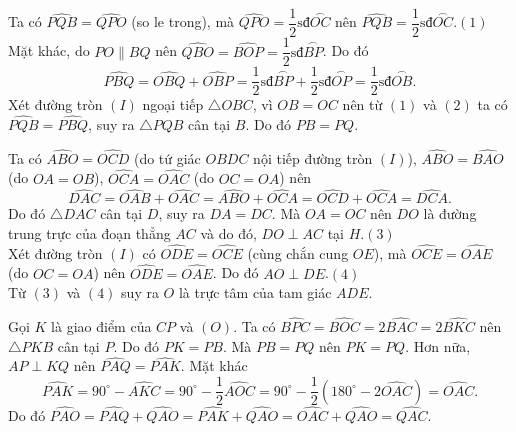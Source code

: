 \begin{ex}
{    \begin{listEX}
        \item Ta có $\widehat{PQB}=\widehat{QPO}$ (so le trong), mà $\widehat{QPO}=\dfrac{1}{2}\text{sđ}\overset{\displaystyle\frown}{OC}$ nên $\widehat{PQB}=\dfrac{1}{2}\text{sđ}\overset{\displaystyle\frown}{OC}$.\hfill$(1)$\\
Mặt khác, do $PO\parallel BQ$ nên $\widehat{QBO}=\widehat{BOP}=\dfrac{1}{2}\text{sđ}\overset{\displaystyle\frown}{BP}$. Do đó \[\widehat{PBQ}=\widehat{OBQ}+\widehat{OBP}=\dfrac{1}{2}\text{sđ}\overset{\displaystyle\frown}{BP}+\dfrac{1}{2}\text{sđ}\overset{\displaystyle\frown}{OP}=\dfrac{1}{2}\text{sđ}\overset{\displaystyle\frown}{OB}.\tag{2}\]
Xét đường tròn $(I)$ ngoại tiếp $\triangle OBC$, vì $OB=OC$ nên từ $(1)$ và $(2)$ ta có $\widehat{PQB}=\widehat{PBQ}$, suy ra $\triangle PQB$ cân tại $B$. Do đó $PB=PQ$.
        \item Ta có $\widehat{ABO}=\widehat{OCD}$ (do tứ giác $OBDC$ nội tiếp đường tròn $(I)$), $\widehat{ABO}=\widehat{BAO}$ (do $OA=OB$), $\widehat{OCA}=\widehat{OAC}$ (do $OC=OA$) nên $$\widehat{DAC}=\widehat{OAB}+\widehat{OAC}=\widehat{ABO}+\widehat{OCA}=\widehat{OCD}+\widehat{OCA}=\widehat{DCA}.$$
	Do đó $\triangle DAC$ cân tại $D$, suy ra $DA=DC$. Mà $OA=OC$ nên $DO$ là đường trung trực của đoạn thẳng $AC$ và do đó, $DO\perp AC$ tại $H$.\hfill$(3)$\\
Xét đường tròn $(I)$ có $\widehat{ODE}=\widehat{OCE}$ (cùng chắn cung $OE$), mà $\widehat{OCE}=\widehat{OAE}$ (do $OC=OA$) nên $\widehat{ODE}=\widehat{OAE}$. Do đó $AO\perp DE$.\hfill$(4)$\\
Từ $(3)$ và $(4)$ suy ra $O$ là trực tâm của tam giác $ADE$.
        \item Gọi $K$ là giao điểm của $CP$ và $(O)$. Ta có $\widehat{BPC}=\widehat{BOC}=2\widehat{BAC}=2\widehat{BKC}$ nên $\triangle PKB$ cân tại $P$. Do đó $PK=PB$. Mà $PB=PQ$ nên $PK=PQ$. Hơn nữa, $AP\perp KQ$ nên $\widehat{PAQ}=\widehat{PAK}$. Mặt khác
$$\widehat{PAK}=90^\circ-\widehat{AKC}=90^\circ-\dfrac{1}{2}\widehat{AOC}=90^\circ-\dfrac{1}{2}\left(180^\circ-2\widehat{OAC}\right)=\widehat{OAC}.$$
Do đó $\widehat{PAO}=\widehat{PAQ}+\widehat{QAO}=\widehat{PAK}+\widehat{QAO}=\widehat{OAC}+\widehat{QAO}=\widehat{QAC}.$
    \end{listEX}
    }
\end{ex}

